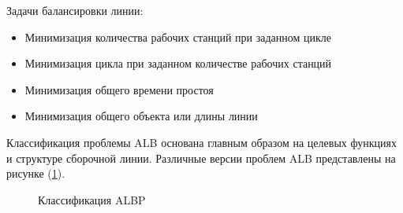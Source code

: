 Задачи балансировки линии:

\begin{itemize}
    \item Минимизация количества рабочих станций при заданном цикле
    \item Минимизация цикла при заданном количестве рабочих станций
    \item Минимизация общего времени простоя
    \item Минимизация общего объекта или длины линии
\end{itemize}

Классификация проблемы ALB основана главным образом на целевых функциях и структуре сборочной линии. Различные версии проблем ALB представлены на рисунке (\ref{ris:image1}).

\begin{figure}[H]
    \caption{Классификация ALBP}
    \label{ris:image1}
\end{figure}

